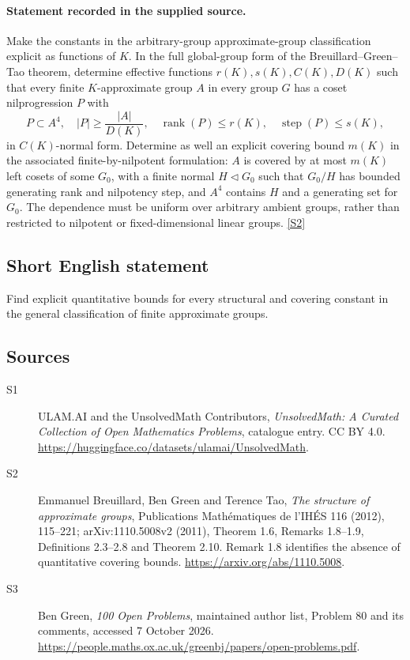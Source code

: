 \documentclass[11pt]{article}
\newcommand{\sref}[2]{\hyperlink{source:#1:#2}{[S#2]}}
\begin{document}
\paragraph{Statement recorded in the supplied source.}
Make the constants in the arbitrary-group approximate-group classification explicit as functions of $K$. In the full global-group form of the Breuillard--Green--Tao theorem, determine effective functions $r(K),s(K),C(K),D(K)$ such that every finite $K$-approximate group $A$ in every group $G$ has a coset nilprogression $P$ with
\[
 P\subset A^4,\quad |P|\geq\frac{|A|}{D(K)},\quad
 \operatorname{rank}(P)\leq r(K),\quad\operatorname{step}(P)\leq s(K),
\]
in $C(K)$-normal form. Determine as well an explicit covering bound $m(K)$ in the associated finite-by-nilpotent formulation: $A$ is covered by at most $m(K)$ left cosets of some $G_0$, with a finite normal $H\triangleleft G_0$ such that $G_0/H$ has bounded generating rank and nilpotency step, and $A^4$ contains $H$ and a generating set for $G_0$. The dependence must be uniform over arbitrary ambient groups, rather than restricted to nilpotent or fixed-dimensional linear groups. \sref{statement}{2}
\subsection{Short English statement}
Find explicit quantitative bounds for every structural and covering constant in the general classification of finite approximate groups.
\subsection{Sources}
\begin{description}
\item[\hypertarget{source:statement:1}{S1}] ULAM.AI and the UnsolvedMath Contributors, \emph{UnsolvedMath: A Curated Collection of Open Mathematics Problems}, catalogue entry. CC BY 4.0. \url{https://huggingface.co/datasets/ulamai/UnsolvedMath}.
\item[\hypertarget{source:statement:2}{S2}] Emmanuel Breuillard, Ben Green and Terence Tao, \emph{The structure of approximate groups}, Publications Mathématiques de l’IHÉS 116 (2012), 115--221; arXiv:1110.5008v2 (2011), Theorem 1.6, Remarks 1.8--1.9, Definitions 2.3--2.8 and Theorem 2.10. Remark 1.8 identifies the absence of quantitative covering bounds. \url{https://arxiv.org/abs/1110.5008}.
\item[\hypertarget{source:statement:3}{S3}] Ben Green, \emph{100 Open Problems}, maintained author list, Problem 80 and its comments, accessed 7 October 2026. \url{https://people.maths.ox.ac.uk/greenbj/papers/open-problems.pdf}.
\end{description}
\label{end:statement}
\end{document}
